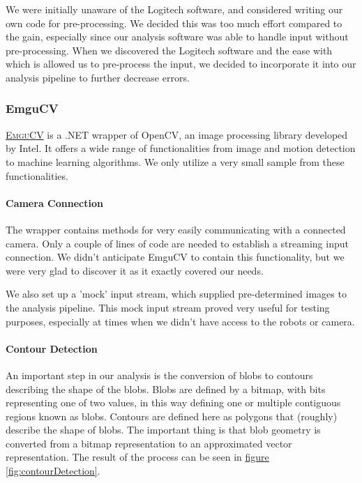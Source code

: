 \documentclass[10pt, abstracton]{scrartcl}
\newcommand{\fref}[1]{\hyperref[#1]{figure \vref{#1}}}
\newcommand{\link}[2]{\textsc{\href{#1}{#2}}}
\begin{document}
We were initially unaware of the Logitech software, and considered writing our own code for pre-processing. We decided this was too much effort compared to the gain, especially since our analysis software was able to handle input without pre-processing. When we discovered the Logitech software and the ease with which is allowed us to pre-process the input, we decided to incorporate it into our analysis pipeline to further decrease errors.

\subsubsection{EmguCV}
\link{http://www.emgu.com/wiki/index.php/Main_Page}{EmguCV} is a .NET wrapper of OpenCV, an image processing library developed by Intel. It offers a wide range of functionalities from image and motion detection to machine learning algorithms. We only utilize a very small sample from these functionalities.

\paragraph{Camera Connection}
The wrapper contains methods for very easily communicating with a connected camera. Only a couple of lines of code are needed to establish a streaming input connection. We didn't anticipate EmguCV to contain this functionality, but we were very glad to discover it as it exactly covered our needs.

We also set up a 'mock' input stream, which supplied pre-determined images to the analysis pipeline. This mock input stream proved very useful for testing purposes, especially at times when we didn't have access to the robots or camera.

\paragraph{Contour Detection}
An important step in our analysis is the conversion of blobs to contours describing the shape of the blobs. Blobs are defined by a bitmap, with bits representing one of two values, in this way defining one or multiple contiguous regions known as blobs. Contours are defined here as polygons that (roughly) describe the shape of blobs. The important thing is that blob geometry is converted from a bitmap representation to an approximated vector representation. The result of the process can be seen in \fref{fig:contourDetection}.
\end{document}
